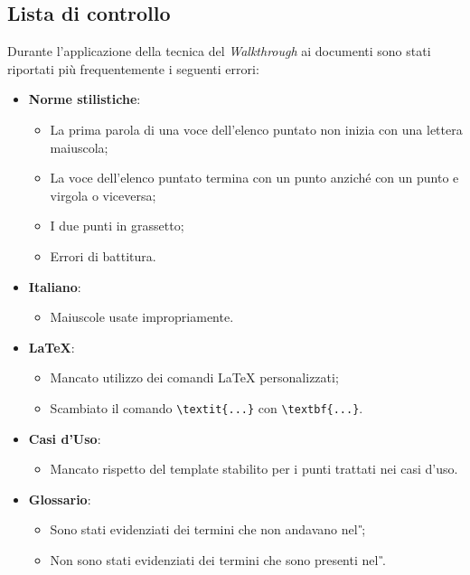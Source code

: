 \subsection{Lista di controllo}
Durante l'applicazione della tecnica del \textit{Walkthrough} ai documenti sono stati riportati
più frequentemente i seguenti errori:
\begin{itemize}
  \item\textbf{Norme stilistiche}:
  \begin{itemize}
    \item La prima parola di una voce dell'elenco puntato non inizia con una lettera maiuscola;
    \item La voce dell'elenco puntato termina con un punto anziché con un punto e virgola o viceversa;
    \item I due punti in grassetto;
    \item Errori di battitura.
    
  \end{itemize}

  \item\textbf{Italiano}:
  \begin{itemize}
    \item Maiuscole usate impropriamente.
    
  \end{itemize}

  \item\textbf{\LaTeX}:
  \begin{itemize}
  \item Mancato utilizzo dei comandi \LaTeX{} personalizzati;
  \item Scambiato il comando \verb|\textit{...}| con \verb|\textbf{...}|.
  \end{itemize}
  
  \item\textbf{Casi d'Uso}:
  \begin{itemize}
\item Mancato rispetto del template stabilito per i punti trattati nei casi d'uso.
  \end{itemize}

	\item\textbf{Glossario}:
	\begin{itemize}
		\item Sono stati evidenziati dei termini che non andavano nel \textit{\G{}};
		\item Non sono stati evidenziati dei termini che sono presenti nel \textit{\G{}}.
	\end{itemize}

\end{itemize}
